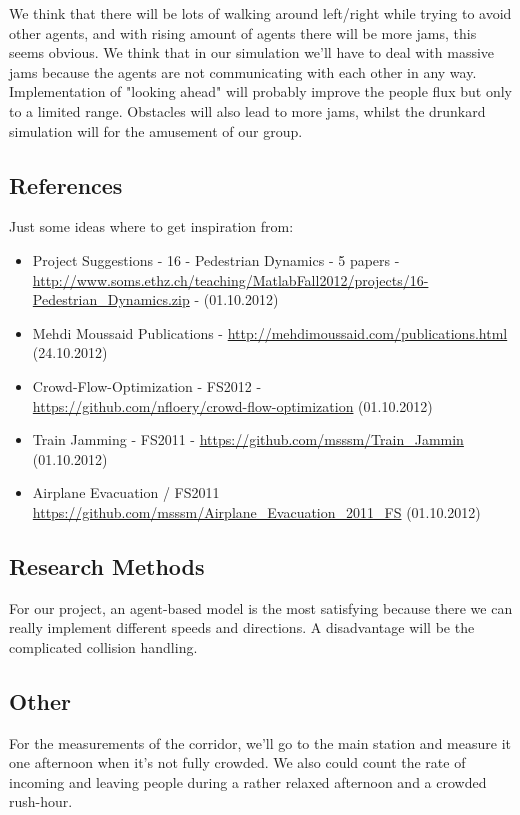 We think that there will be lots of walking around left/right while trying to avoid other agents, and with rising amount of agents there will be more jams, this seems obvious. We think that in our simulation we'll have to deal with massive jams because the agents are not communicating with each other in any way. Implementation of "looking ahead" will probably improve the people flux but only to a limited range. Obstacles will also lead to more jams, whilst the drunkard simulation will for the amusement of our group.

\subsection*{References}

Just some ideas where to get inspiration from:
\begin{itemize}
 \item Project Suggestions - 16 - Pedestrian Dynamics - 5 papers - \\ \url{http://www.soms.ethz.ch/teaching/MatlabFall2012/projects/16-Pedestrian_Dynamics.zip} - (01.10.2012)
 \item Mehdi Moussaid Publications - \url{http://mehdimoussaid.com/publications.html} (24.10.2012)
 \item Crowd-Flow-Optimization - FS2012 - \\ \url{https://github.com/nfloery/crowd-flow-optimization} (01.10.2012)
 \item Train Jamming - FS2011 - \url{https://github.com/msssm/Train_Jammin} \\(01.10.2012)
 \item Airplane Evacuation / FS2011 \url{https://github.com/msssm/Airplane_Evacuation_2011_FS} (01.10.2012)
\end{itemize}
 
\subsection*{Research Methods}

For our project, an agent-based model is the most satisfying because there we can really implement different speeds and directions. A disadvantage will be the complicated collision handling.

\subsection*{Other}

For the measurements of the corridor, we'll go to the main station and measure it one afternoon when it's not fully crowded. We also could count the rate of incoming and leaving people during a rather relaxed afternoon and a crowded rush-hour.